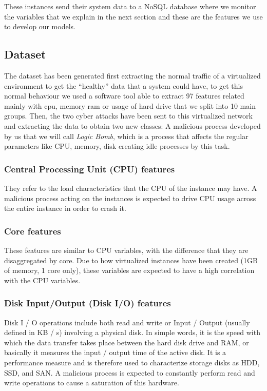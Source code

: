 \documentclass{iosart2c}
\begin{document}
These instances send their system data to a NoSQL database where we monitor the variables that we explain in the next section and these are the features we use to develop our models.

\subsection{Dataset}\label{dataset_autoencoder}

The dataset has been generated first extracting the normal traffic of a virtualized environment to get the ``healthy'' data that a system could have, to get this normal behaviour we used a software tool able to extract 97 features related mainly with cpu, memory ram or usage of hard drive that we split into 10 main groups. Then, the two cyber attacks have been sent to this virtualized network and extracting the data to obtain two new classes: A malicious process developed by us that we will call \textit{Logic Bomb}, which is a process that affects the regular parameters like CPU, memory, disk creating idle processes by this task.

\subsubsection{Central Processing Unit (CPU) features}
They refer to the load characteristics that the CPU of the instance may have. A malicious process acting on the instances is expected to drive CPU usage across the entire instance in order to crash it.\\


\subsubsection{Core features}

These features are similar to CPU variables, with the difference that they are disaggregated by core. Due to how virtualized instances have been created (1GB of memory, 1 core only), these variables are expected to have a high correlation with the CPU variables.


\subsubsection{Disk Input/Output (Disk I/O) features}

Disk I / O operations include both read and write or Input / Output (usually defined in KB / s) involving a physical disk. In simple words, it is the speed with which the data transfer takes place between the hard disk drive and RAM, or basically it measures the input / output time of the active disk. It is a performance measure and is therefore used to characterize storage disks as HDD, SSD, and SAN. A malicious process is expected to constantly perform read and write operations to cause a saturation of this hardware. \\
\end{document}
